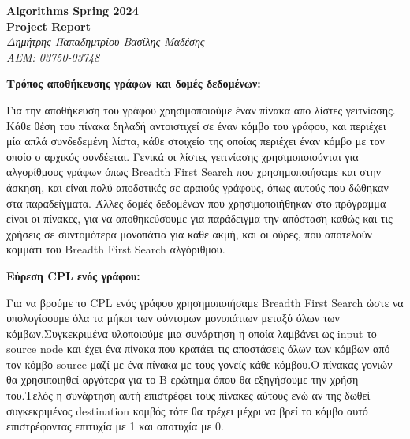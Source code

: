 \documentclass{article}
\begin{document}
\begin{titlepage}
   \begin{center}
   	  \Large\textbf{Algorithms Spring 2024}\\
      \Large\textbf{Project Report}\\
      \large\textit{Δημήτρης Παπαδημτρίου-Βασίλης Μαδέσης}\\
      \large\textit{AEM: 03750-03748}
   \end{center}
\end{titlepage}

\textbf{Τρόπος αποθήκευσης γράφων και δομές δεδομένων:}\bigbreak

Για την αποθήκευση του γράφου χρησιμοποιούμε έναν πίνακα απο λίστες γειτνίασης. Κάθε θέση του πίνακα δηλαδή αντοιστιχεί σε έναν κόμβο του γράφου, και περιέχει μία απλά συνδεδεμένη λίστα, κάθε στοιχείο της οποίας περιέχει 
έναν κόμβο με τον οποίο ο αρχικός συνδέεται. Γενικά οι λίστες γειτνίασης χρησιμοποιούνται για αλγορίθμους γράφων όπως  Breadth First Search που χρησημοποιήσαμε και στην άσκηση,
και είναι πολύ αποδοτικές σε αραιούς γράφους, όπως αυτούς που δώθηκαν στα παραδείγματα.\break
Άλλες δομές δεδομένων που χρησιμοποιήθηκαν στο πρόγραμμα είναι οι πίνακες, για να αποθηκεύσουμε για παράδειγμα την απόσταση καθώς και τις χρήσεις σε συντομότερα μονοπάτια για κάθε ακμή, και οι ούρες, που αποτελούν κομμάτι
του  Breadth First Search αλγόριθμου.\bigbreak

\textbf{Εύρεση CPL ενός γράφου:}\bigbreak

Για να βρούμε το CPL ενός γράφου χρησημοποιήσαμε Breadth First Search ώστε να υπολογίσουμε όλα τα μήκοι των σύντομων μονοπάτιων μεταξύ όλων των κόμβων.Συγκεκριμένα υλοποιούμε μια συνάρτηση η οποία λαμβάνει ως input το source node και έχει ένα πίνακα που κρατάει τις αποστάσεις όλων των κόμβων από τον κόμβο source μαζί με ένα πίνακα με τους γονείς κάθε κόμβου.Ο πίνακας γονιών θα χρησιποιηθεί αργότερα για το Β ερώτημα όπου θα εξηγήσουμε την χρήση του.Τελός η συνάρτηση αυτή επιστρέφει τους πίνακες αύτους ενώ αν της δωθεί συγκεκριμένος destination κομβός τότε θα τρέχει μέχρι να βρεί το κόμβο αυτό επιστρέφοντας επιτυχία με 1 και αποτυχία με 0.\bigbreak
\end{document}
